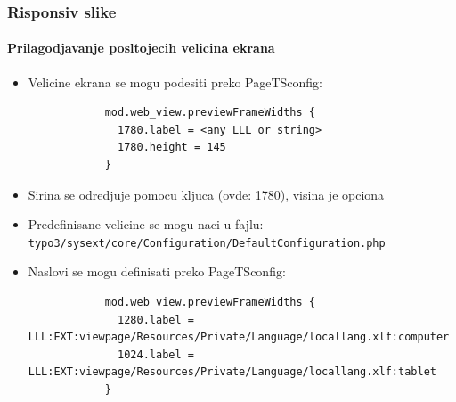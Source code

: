
\begin{frame}[fragile]
	\frametitle{Risponsiv slike}
	\framesubtitle{Prilagodjavanje posltojecih velicina ekrana}

	\begin{itemize}
		\item Velicine ekrana se mogu podesiti preko PageTSconfig:


		\begin{lstlisting}
			mod.web_view.previewFrameWidths {
			  1780.label = <any LLL or string>
			  1780.height = 145
			}
		\end{lstlisting}

		\item Sirina se odredjuje pomocu kljuca (ovde: 1780), visina je opciona
		\item Predefinisane velicine se mogu naci u fajlu:\newline
			\small\texttt{typo3/sysext/core/Configuration/DefaultConfiguration.php}\normalsize
		\item Naslovi se mogu definisati preko PageTSconfig:

		\begin{lstlisting}
			mod.web_view.previewFrameWidths {
			  1280.label = LLL:EXT:viewpage/Resources/Private/Language/locallang.xlf:computer
			  1024.label = LLL:EXT:viewpage/Resources/Private/Language/locallang.xlf:tablet
			}
		\end{lstlisting}

	\end{itemize}

\end{frame}


